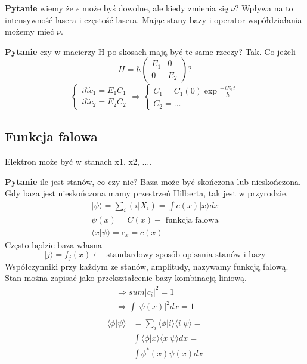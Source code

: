 \textbf{Pytanie} wiemy że $\epsilon$ może byś dowolne, ale kiedy zmienia się $\nu$? Wpływa na to intensywność lasera i częstość lasera. Mając stany bazy i operator współdziałania możemy mieć $\nu$.

\textbf{Pytanie} czy w macierzy H po skosach mają być te same rzeczy? Tak.
Co jeżeli
\begin{equation*}
	H = \hbar \begin{pmatrix} E_1 & 0 \\ 0 & E_2  \end{pmatrix}?
\end{equation*}
\begin{equation*}
	\begin{cases}
		i \hbar \dot{c}_1 = E_1 C_1 \\
		i \hbar \dot{c}_2 = E_2 C_2
	\end{cases}
	\Rightarrow
	\begin{cases}
		C_1 = C_1(0) \exp{\frac{-iE_1t}{\hbar}} \\
		C_2 = \dots
	\end{cases}
\end{equation*}
\subsection{Funkcja falowa}
Elektron może być w stanach x1, x2, $\dots$.
 
\textbf{Pytanie} ile jest stanów, $\infty$ czy nie? Baza może być skończona lub nieskończona. Gdy baza jest nieskończona mamy przestrzeń Hilberta, tak jest w przyrodzie.
\begin{equation*}
	\begin{split}
		\vert \psi \rangle = \sum_i (i \vert X_i) = \int c(x) \vert x \rangle dx \\
		\psi(x) = C(x) - \text{ funkcja falowa} \\
		\langle x \vert \psi \rangle = c_x = c(x)
	\end{split}
\end{equation*}
Często będzie baza własna
\begin{equation*}
	\vert j \rangle = f_j(x) \leftarrow \text{ standardowy sposób opisania stanów i bazy}
\end{equation*}
Współczynniki przy każdym ze stanów, amplitudy, nazywamy funkcją falową. Stan można zapisać jako przekształcenie bazy kombinacją liniową.
\begin{equation*}
	\begin{split}
		\Rightarrow sum \vert c_i \vert^2 = 1 \\
		\Rightarrow \int \vert \psi(x) \vert^2 dx = 1 \\
	\end{split}
\end{equation*}
\begin{equation*}
	\begin{split}
		\langle \phi \vert \psi \rangle &= \sum_i \langle \phi \vert i \rangle \langle i \vert \psi \rangle = \\
		&\int \langle \phi \vert x \rangle \langle x \vert \psi \rangle dx = \\
		& \int \phi^*(x) \psi(x) dx
	\end{split}	
\end{equation*}
